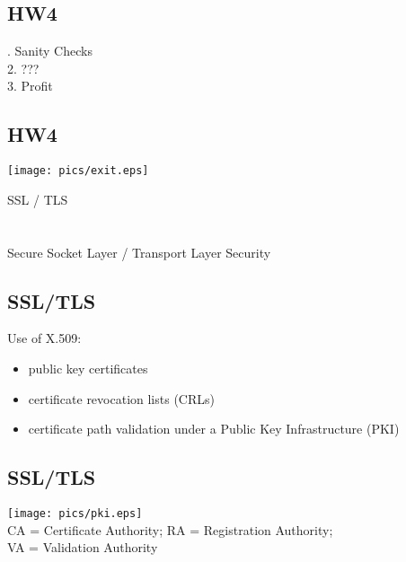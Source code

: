 \documentclass[xga]{xdvislides}
\begin{document}
\subsection{HW4}

\vspace*{\fill}
. Sanity Checks \\

2. ??? \\

3. Profit \\
\Normalsize
\vspace*{\fill}

\subsection{HW4}
\begin{center}
	\texttt{[image: pics/exit.eps]} \\
\end{center}

\newpage
\vspace*{\fill}
\begin{center}
	\Hugesize
		SSL / TLS\\ [1em]
	\hspace*{5mm}
	\blueline\\
	\hspace*{5mm}\\
		Secure Socket Layer / Transport Layer Security
\end{center}
\vspace*{\fill}


\subsection{SSL/TLS}
Use of X.509:
\begin{itemize}
	\item public key certificates
	\item certificate revocation lists (CRLs)
	\item certificate path validation under a Public Key Infrastructure (PKI)
\end{itemize}

\subsection{SSL/TLS}
\begin{center}
	\texttt{[image: pics/pki.eps]} \\
CA = Certificate Authority;  RA = Registration Authority; \\
VA = Validation Authority
\end{center}
\end{document}

